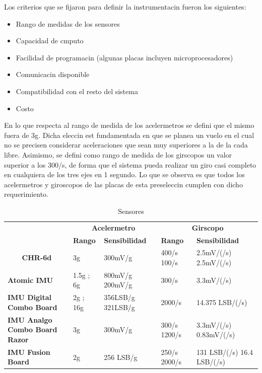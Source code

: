 \documentclass[spanish,12pt,a4paper,titlepage]{report}
\begin{document}
Los criterios que se fijaron para definir la instrumentacin fueron los siguientes:
\begin{itemize}
\item
Rango de medidas de los sensores
\item
Capacidad de cmputo
\item
Facilidad de programacin (algunas placas incluyen microprocesadores)
\item
Comunicacin disponible 
\item
Compatibilidad con el resto del sistema
\item
Costo
\end{itemize}

En lo que respecta al rango de medida de los acelermetros se defini que el mismo fuera de 3g. Dicha eleccin est fundamentada en que se planea un vuelo en el cual no se precisen considerar aceleraciones que sean muy superiores a la de la cada libre.  Asimismo, se defini como rango de medida de los girscopos un valor  superior a los 300/s, de forma que el sistema pueda realizar un giro casi completo en cualquiera de los tres ejes en 1 segundo. 
Lo que se observa es que todos los acelermetros y giroscopos de las placas de esta preseleccin cumplen con dicho requerimiento.


\begin{table}[H]
\begin{tabular}{p{115pt}|p{55pt}|p{65pt}|p{55pt}|p{90pt}|} 
\cline{2-5} 
& \multicolumn{2}{|c|}{\cellcolor[gray]{0.7}\textbf{Acelermetro}} 
& \multicolumn{2}{|c|}{\cellcolor[gray]{0.7}\textbf{Girscopo}}  \\ \cline{2-5}
& \cellcolor[gray]{0.8} \textbf{Rango} 
& \cellcolor[gray]{0.8} \textbf{Sensibilidad}
& \cellcolor[gray]{0.8} \textbf{Rango} 
& \cellcolor[gray]{0.8} \textbf{Sensibilidad} \\ \cline{2-5} \hline
\multicolumn{1}{|c|}{\cellcolor[gray]{0.8}\textbf{CHR-6d}}
& 3g & 300mV/g &  400/s  100/s &  2.5mV/(/s)  2.5mV/(/s) \\ \hline
\multicolumn{1}{|p{115pt}|}{\cellcolor[gray]{0.8}\textbf{Atomic IMU}}
&  1.5g  ;  6g &  800mV/g   200mV/g &  300/s  &  3.3mV/(/s)\\ \hline
\multicolumn{1}{|p{115pt}|}{\cellcolor[gray]{0.8}\textbf{IMU Digital Combo Board}}
&  2g  ;  16g &  356LSB/g   321LSB/g &  2000/s  &  14.375 LSB/(/s)\\ \hline
\multicolumn{1}{|p{115pt}|}{\cellcolor[gray]{0.8}\textbf{IMU Analgo Combo Board Razor}}
&  3g &  300mV/g  &  300/s  1200/s &  3.3mV/(/s)  0.83mV/(/s)\\ \hline
\multicolumn{1}{|p{115pt}|}{\cellcolor[gray]{0.8}\textbf{IMU Fusion Board}}
&  2g &  256 LSB/g  &  250/s  2000/s &  131 LSB/(/s)     16.4 LSB/(/s)\\
\hline 
\end{tabular}
\caption{Sensores}
\label{tab:sensores}
\end{table}
\end{document}

